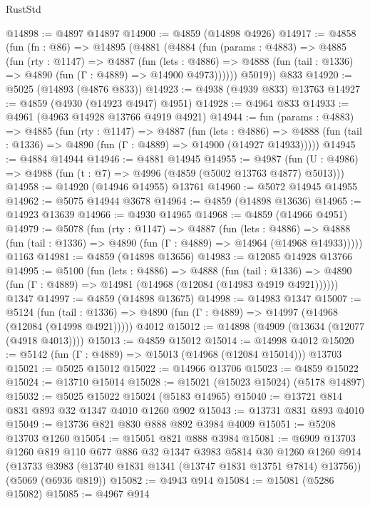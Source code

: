 \begin{lexlean}{RustStd}
\begin{coremodule}
@14898 := @4897 @14897
@14900 := @4859 (@14898 @4926)
@14917 := @4858
    (fun (fn : @86) =>
    @14895
      (@4881
        (@4884
          (fun (params : @4883) =>
          @4885
            (fun (rty : @1147) =>
            @4887
              (fun (lets : @4886) =>
              @4888 (fun (tail : @1336) => @4890 (fun (Γ : @4889) => @14900 @4973))))))
        @5019))
    @833
@14920 := @5025 (@14893 (@4876 @833))
@14923 := @4938 (@4939 @833) @13763
@14927 := @4859 (@4930 (@14923 @4947) @4951)
@14928 := @4964 @833
@14933 := @4961 (@4963 @14928 @13766 @4919 @4921)
@14944 := fun (params : @4883) =>
  @4885
    (fun (rty : @1147) =>
    @4887
      (fun (lets : @4886) =>
      @4888 (fun (tail : @1336) => @4890 (fun (Γ : @4889) => @14900 (@14927 @14933)))))
@14945 := @4884 @14944
@14946 := @4881 @14945
@14955 := @4987
    (fun (U : @4986) => @4988 (fun (t : @7) => @4996 (@4859 (@5002 @13763 @4877) @5013)))
@14958 := @14920 (@14946 @14955) @13761
@14960 := @5072 @14945 @14955
@14962 := @5075 @14944 @3678
@14964 := @4859 (@14898 @13636)
@14965 := @14923 @13639
@14966 := @4930 @14965
@14968 := @4859 (@14966 @4951)
@14979 := @5078
    (fun (rty : @1147) =>
    @4887
      (fun (lets : @4886) =>
      @4888 (fun (tail : @1336) => @4890 (fun (Γ : @4889) => @14964 (@14968 @14933)))))
    @1163
@14981 := @4859 (@14898 @13656)
@14983 := @12085 @14928 @13766
@14995 := @5100
    (fun (lets : @4886) =>
    @4888
      (fun (tail : @1336) =>
      @4890 (fun (Γ : @4889) => @14981 (@14968 (@12084 (@14983 @4919 @4921))))))
    @1347
@14997 := @4859 (@14898 @13675)
@14998 := @14983 @1347
@15007 := @5124
    (fun (tail : @1336) => @4890 (fun (Γ : @4889) => @14997 (@14968 (@12084 (@14998 @4921)))))
    @4012
@15012 := @14898 (@4909 (@13634 (@12077 (@4918 @4013))))
@15013 := @4859 @15012
@15014 := @14998 @4012
@15020 := @5142 (fun (Γ : @4889) => @15013 (@14968 (@12084 @15014))) @13703
@15021 := @5025 @15012
@15022 := @14966 @13706
@15023 := @4859 @15022
@15024 := @13710 @15014
@15028 := @15021 (@15023 @15024) (@5178 @14897)
@15032 := @5025 @15022 @15024 (@5183 @14965)
@15040 := @13721 @814 @831 @893 @32 @1347 @4010 @1260 @902
@15043 := @13731 @831 @893 @4010
@15049 := @13736 @821 @830 @888 @892 @3984 @4009
@15051 := @5208 @13703 @1260
@15054 := @15051 @821 @888 @3984
@15081 := @6909
    @13703
    @1260
    @819
    @110
    @677
    @886
    @32
    @1347
    @3983
    @5814
    @30
    @1260
    @1260
    @914
    (@13733 @3983 (@13740 @1831 @1341 (@13747 @1831 @13751 @7814) @13756))
    (@5069 (@6936 @819))
@15082 := @4943 @914
@15084 := @15081 (@5286 @15082)
@15085 := @4967 @914

\end{coremodule}
\end{lexlean}
